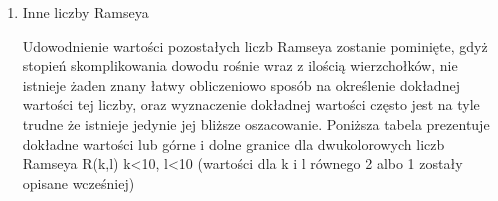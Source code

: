 \documentclass[11pt]{article}
\begin{document}
\begin{enumerate}
\item Inne liczby Ramseya \hfill \par

 Udowodnienie wartości pozostałych liczb Ramseya zostanie pominięte, gdyż stopień skomplikowania dowodu rośnie wraz z ilością wierzchołków, nie istnieje żaden znany łatwy obliczeniowo sposób na określenie dokładnej wartości tej liczby, oraz wyznaczenie dokładnej wartości często jest na tyle trudne że istnieje jedynie jej bliższe oszacowanie. Poniższa tabela prezentuje dokładne wartości lub górne i dolne granice dla dwukolorowych liczb Ramseya R(k,l) k<10, l<10 (wartości dla k i l równego 2 albo 1 zostały opisane wcześniej)
 
\hfill 
\begin{figure}[h]
  \centering
{}
\end{figure}
\end{enumerate}
\end{document}
